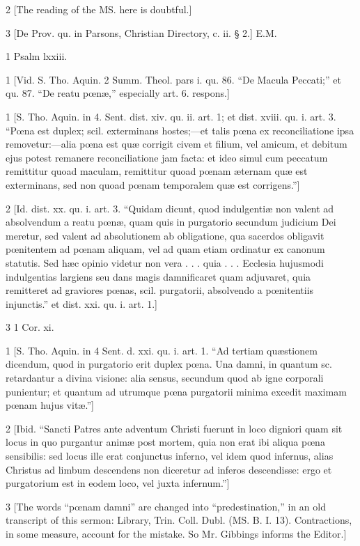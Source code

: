 2
[The reading of the MS. here is doubtful.]

3
[De Prov. qu. in Parsons, Christian Directory, c. ii. § 2.] E.M.

1
Psalm lxxiii.

1
[Vid. S. Tho. Aquin. 2 Summ. Theol. pars i. qu. 86. “De Macula Peccati;” et qu. 87. “De reatu pœnæ,” especially art. 6. respons.]

1
[S. Tho. Aquin. in 4. Sent. dist. xiv. qu. ii. art. 1; et dist. xviii. qu. i. art. 3. “Pœna est duplex; scil. exterminans hostes;—et talis pœna ex reconciliatione ipsa removetur:—alia pœna est quæ corrigit civem et filium, vel amicum, et debitum ejus potest remanere reconciliatione jam facta: et ideo simul cum peccatum remittitur quoad maculam, remittitur quoad pœnam æternam quæ est exterminans, sed non quoad pœnam temporalem quæ est corrigens.”]

2
[Id. dist. xx. qu. i. art. 3. “Quidam dicunt, quod indulgentiæ non valent ad absolvendum a reatu pœnæ, quam quis in purgatorio secundum judicium Dei meretur, sed valent ad absolutionem ab obligatione, qua sacerdos obligavit pœnitentem ad pœnam aliquam, vel ad quam etiam ordinatur ex canonum statutis. Sed hæc opinio videtur non vera . . . quia . . . Ecclesia hujusmodi indulgentias largiens seu dans magis damnificaret quam adjuvaret, quia remitteret ad graviores pœnas, scil. purgatorii, absolvendo a pœnitentiis injunctis.” et dist. xxi. qu. i. art. 1.]

3
1 Cor. xi.

1
[S. Tho. Aquin. in 4 Sent. d. xxi. qu. i. art. 1. “Ad tertiam quæstionem dicendum, quod in purgatorio erit duplex pœna. Una damni, in quantum sc. retardantur a divina visione: alia sensus, secundum quod ab igne corporali punientur; et quantum ad utrumque pœna purgatorii minima excedit maximam pœnam hujus vitæ.”]

2
[Ibid. “Sancti Patres ante adventum Christi fuerunt in loco digniori quam sit locus in quo purgantur animæ post mortem, quia non erat ibi aliqua pœna sensibilis: sed locus ille erat conjunctus inferno, vel idem quod infernus, alias Christus ad limbum descendens non diceretur ad inferos descendisse: ergo et purgatorium est in eodem loco, vel juxta infernum.”]

3
[The words “pœnam damni” are changed into “predestination,” in an old transcript of this sermon: Library, Trin. Coll. Dubl. (MS. B. I. 13). Contractions, in some measure, account for the mistake. So Mr. Gibbings informs the Editor.]

